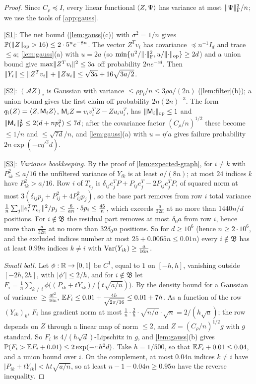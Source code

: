 \begin{proof}
Since $C_\rho\preceq I$, every linear functional $\langle Z,\Psi\rangle$ has variance at
most $\lVert \Psi\rVert_{\mathrm F}^2/n$; we use the tools of \cref{app:gauss}.

\ref{S1}: The net bound (\cref{lem:gauss}(c)) with $\sigma^2=1/n$ gives
$\mathbb P(\lVert Z\rVert_{\mathrm{op}}>16)\le2\cdot5^ne^{-8n}$. The vector $Z^Tv_i$ has covariance
$\preceq n^{-1}I_d$ and trace $\le a$; \cref{lem:gauss}(a) with $u=2a$ (so
$\min\{u^2/\lVert \cdot\rVert_{\mathrm F}^2,u/\lVert \cdot\rVert_{\mathrm{op}}\}\ge2d$) and a union bound give
$\max\lVert Z^Tv_i\rVert^2\le3a$ off probability $2ne^{-cd}$. Then
$\lVert Y_i\rVert\le\lVert Z^Tv_i\rVert+\lVert Zu_i\rVert\le\sqrt{3a}+16\sqrt{3a/2}$.

\ref{S2}: $(\mathcal AZ)_i$ is Gaussian with variance $\le\rho p_i/n\le3\rho
a/(2n)$ (\cref{lem:filter}(b)); a union bound gives the first claim off
probability $2n(2n)^{-3}$. The form $q_i(Z)=\langle Z,\mathsf M_iZ\rangle$,
$\mathsf M_iZ=v_iv_i^TZ-Zu_iu_i^T$, has $\lVert \mathsf M_i\rVert_{\mathrm{op}}\le1$ and
$\lVert \mathsf M_i\rVert_{\mathrm F}^2\le2(d+np_i^2)\le7d$; after the covariance factor
$(C_\rho/n)^{1/2}$ these become $\le1/n$ and $\le\sqrt{7d}/n$, and
\cref{lem:gauss}(a) with $u=\eta'a$ gives failure probability $2n\exp(-c\eta'^2d)$.

\ref{S3}: \emph{Variance bookkeeping.} By the proof of
\cref{lem:expected-graph}, for $i\ne k$ with $P_{ik}^2\le a/16$ the unfiltered
variance of $Y_{ik}$ is at least $a/(8n)$; at most $24$ indices $k$ have
$P_{ik}^2>a/16$. Row $i$ of $T_{e_j}$ is
$\delta_{ij}e_j^TP+P_{ij}e_j^T-2P_{ij}e_j^TP$, of squared norm at most
$3(\delta_{ij}p_j+P_{ij}^2+4P_{ij}^2p_j)$, so the base part removes from row $i$
total variance $\frac1n\sum_j\lVert e_i^TT_{e_j}\rVert^2/p_j\le\frac6{an}\cdot5p_i\le
\frac{45}n$, which exceeds $\frac a{32n}$ at no more than $1440n/d$ positions.
For $i\notin\mathfrak B$ the residual part removes at most $\delta_0a$ from row
$i$, hence more than $\frac a{32n}$ at no more than $32\delta_0n$ positions. So for
$d\ge10^6$ (hence $n\ge2\cdot10^6$, and the excluded indices number at most
$25+0.0065n\le0.01n$) every $i\notin\mathfrak B$ has at least $0.99n$ indices $k\ne i$
with $\operatorname{Var}(Y_{ik})\ge\frac a{16n}$.

\emph{Small ball.} Let $\phi:\mathbb R\to[0,1]$ be $C^1$, equal to $1$ on $[-h,h]$,
vanishing outside $[-2h,2h]$, with $|\phi'|\le2/h$, and for $i\notin\mathfrak B$
let $F_i=\frac1n\sum_{k\ne i}\phi\bigl((P_{ik}+tY_{ik})/(t\sqrt{a/n})\bigr)$. By
the density bound for a Gaussian of variance $\ge\frac{at^2}{16n}$,
$\mathbb E F_i\le0.01+\frac{4h}{\sqrt{2\pi/16}}\le0.01+7h$. As a function of the row
$(Y_{ik})_k$, $F_i$ has gradient norm at most
$\frac1n\cdot\frac2h\cdot\sqrt{n/a}\cdot\sqrt n=2/(h\sqrt a)$; the row depends on
$Z$ through a linear map of norm $\le2$, and $Z=(C_\rho/n)^{1/2}g$ with $g$
standard. So $F_i$ is $4/(h\sqrt d)$-Lipschitz in $g$, and \cref{lem:gauss}(b)
gives $\mathbb P(F_i>\mathbb E F_i+0.01)\le2\exp(-c\,h^2d)$. Take $h=1/500$, so that
$\mathbb E F_i+0.01\le0.04$, and a union bound over $i$. On the complement, at most
$0.04n$ indices $k\ne i$ have $|P_{ik}+tY_{ik}|<ht\sqrt{a/n}$, so at least
$n-1-0.04n\ge0.95n$ have the reverse inequality.


\end{proof}
